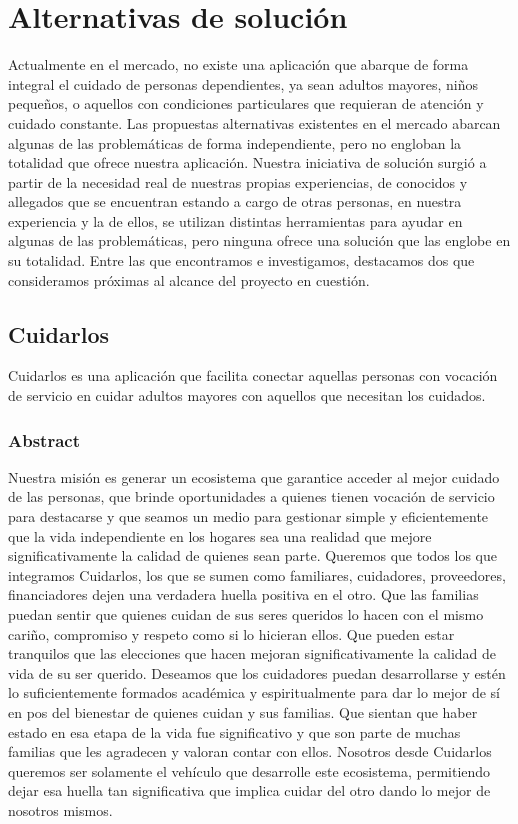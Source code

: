 \documentclass[a4paper,12pt]{article}
\begin{document}
    \section{Alternativas de solución}
    Actualmente en el mercado, no existe una aplicación que abarque de forma integral el cuidado de personas dependientes, ya sean adultos mayores, niños pequeños, o aquellos con condiciones particulares que requieran de atención y cuidado constante.\newline
    Las propuestas alternativas existentes en el mercado abarcan algunas de las problemáticas de forma independiente, pero no engloban la totalidad que ofrece nuestra aplicación.\newline
    Nuestra iniciativa de solución surgió a partir de la necesidad real de nuestras propias experiencias, de conocidos y allegados que se encuentran estando a cargo de otras personas, en nuestra experiencia y la de ellos, se utilizan distintas herramientas para ayudar en algunas de las problemáticas, pero ninguna ofrece una solución que las englobe en su totalidad.\newline
    Entre las que encontramos e investigamos, destacamos dos que consideramos próximas al alcance del proyecto en cuestión.
    \subsection{Cuidarlos}
    Cuidarlos es una aplicación que facilita conectar aquellas personas con vocación de servicio en cuidar adultos mayores con aquellos que necesitan los cuidados.
    \subsubsection{Abstract}
    Nuestra misión es generar un ecosistema que garantice acceder al mejor cuidado de las personas, que brinde oportunidades a quienes tienen vocación de servicio para destacarse y que seamos un medio para gestionar simple y eficientemente que la vida independiente en los hogares sea una realidad que mejore significativamente la calidad de quienes sean parte. \newline
    Queremos que todos los que integramos Cuidarlos, los que se sumen como familiares, cuidadores, proveedores, financiadores dejen una verdadera huella positiva en el otro. Que las familias puedan sentir que quienes cuidan de sus seres queridos lo hacen con el mismo cariño, compromiso y respeto como si lo hicieran ellos. Que pueden estar tranquilos que las elecciones que hacen mejoran significativamente la calidad de vida de su ser querido. Deseamos que los cuidadores puedan desarrollarse y estén lo suficientemente formados académica y espiritualmente para dar lo mejor de sí en pos del bienestar de quienes cuidan y sus familias. Que sientan que haber estado en esa etapa de la vida fue significativo y que son parte de muchas familias que les agradecen y valoran contar con ellos. \newline
    Nosotros desde Cuidarlos queremos ser solamente el vehículo que desarrolle este ecosistema, permitiendo dejar esa huella tan significativa que implica cuidar del otro dando lo mejor de nosotros mismos.\cite{Cuidarlos}
\end{document}
